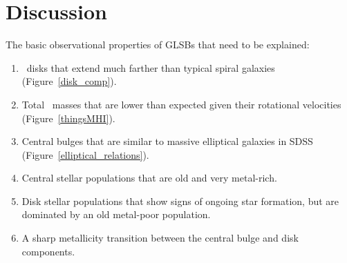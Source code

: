 \documentclass{emulateapj}
\newcommand\kms{km s$^{-1}$}
\newcommand\HI{\ion{H}{1}}
\begin{document}








\section{Discussion}\label{sec:discussion}

The basic observational properties of GLSBs that need to be explained:
\begin{enumerate}
\item{\HI\ disks that extend much farther than typical spiral galaxies (Figure~\ref{disk_comp}). }
\item{Total \HI\ masses that are lower than expected given their rotational velocities (Figure~\ref{thingsMHI}).}
\item{Central bulges that are similar to massive elliptical galaxies in SDSS (Figure~\ref{elliptical_relations}).}
\item{Central stellar populations that are old and very metal-rich.}
\item{Disk stellar populations that show signs of ongoing star formation, but are dominated by an old metal-poor population.}
\item{A sharp metallicity transition between the central bulge and disk components.}
\end{enumerate}
\end{document}
